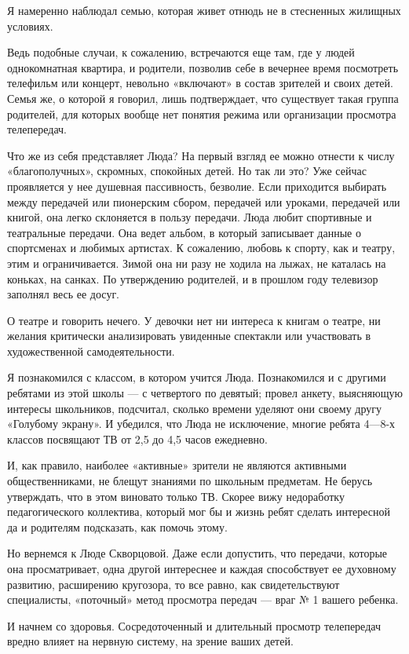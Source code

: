 \documentclass[12pt, a4paper, openany]{book}
\begin{document}
Я намеренно наблюдал семью, которая живет отнюдь не в стесненных жилищных условиях. 

Ведь подобные случаи, к сожалению, встречаются еще там, где у людей однокомнатная квартира, и родители, позволив себе в вечернее время посмотреть телефильм или концерт, невольно «включают» в состав зрителей и своих детей. Семья же, о которой я говорил, лишь подтверждает, что существует такая группа родителей, для которых вообще нет понятия режима или организации просмотра телепередач. 

Что же из себя представляет Люда? На первый взгляд ее можно отнести к числу «благополучных», скромных, спокойных детей. Но так ли это? Уже сейчас проявляется у нее душевная пассивность, безволие. Если приходится выбирать между передачей или пионерским сбором, передачей или уроками, передачей или книгой, она легко склоняется в пользу передачи. Люда любит спортивные и театральные передачи. Она ведет альбом, в который записывает данные о спортсменах и любимых артистах. К сожалению, любовь к спорту, как и театру, этим и ограничивается. Зимой она ни разу не ходила на лыжах, не каталась на коньках, на санках. По утверждению родителей, и в прошлом году телевизор заполнял весь ее досуг. 

О театре и говорить нечего. У девочки нет ни интереса к книгам о театре, ни желания критически анализировать увиденные спектакли или участвовать в художественной самодеятельности. 

Я познакомился с классом, в котором учится Люда. Познакомился и с другими ребятами из этой школы — с четвертого по девятый; провел анкету, выясняющую интересы школьников, подсчитал, сколько времени уделяют они своему другу «Голубому экрану». И убедился, что Люда не исключение, многие ребята 4—8-х классов посвящают ТВ от 2,5 до 4,5 часов ежедневно. 

И, как правило, наиболее «активные» зрители не являются активными общественниками, не блещут знаниями по школьным предметам. Не берусь утверждать, что в этом виновато только ТВ. Скорее вижу недоработку педагогического коллектива, который мог бы и жизнь ребят сделать интересной да и родителям подсказать, как помочь этому. 

Но вернемся к Люде Скворцовой. Даже если допустить, что передачи, которые она просматривает, одна другой интереснее и каждая способствует ее духовному развитию, расширению кругозора, то все равно, как свидетельствуют специалисты, «поточный» метод просмотра передач — враг № 1 вашего ребенка. 

И начнем со здоровья. Сосредоточенный и длительный просмотр телепередач вредно влияет на нервную систему, на зрение ваших детей. 
\end{document}
